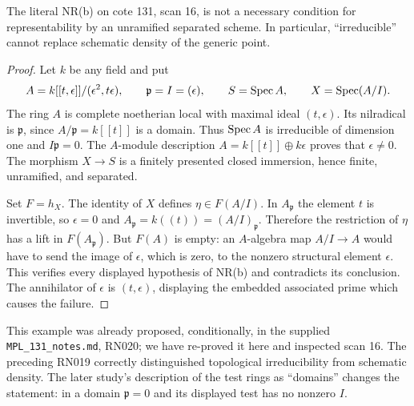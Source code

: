 \begin{proposition}\label{A:NR-counterexample}
The literal NR(b) on cote 131, scan 16, is not a necessary condition for
representability by an unramified separated scheme. In particular,
``irreducible'' cannot replace schematic density of the generic point.
\end{proposition}
\begin{proof}
Let $k$ be any field and put
\[
 A=k[[t,\epsilon]]/(\epsilon^2,t\epsilon),\qquad
 \mathfrak p=I=(\epsilon),\qquad S=\operatorname{Spec} A,\qquad X=\operatorname{Spec}(A/I).
\]
The ring $A$ is complete noetherian local with maximal ideal
$(t,\epsilon)$. Its nilradical is $\mathfrak p$, since $A/\mathfrak p=k[[t]]$
is a domain. Thus $\operatorname{Spec} A$ is irreducible of dimension one and
$I\mathfrak p=0$. The $A$-module description
$A=k[[t]]\oplus k\epsilon$ proves that $\epsilon\ne0$.
The morphism $X\to S$ is a finitely presented closed immersion, hence
finite, unramified, and separated.

Set $F=h_X$. The identity of $X$ defines $\eta\in F(A/I)$.
In $A_{\mathfrak p}$ the element $t$ is invertible, so $\epsilon=0$ and
$A_{\mathfrak p}=k((t))=(A/I)_{\mathfrak p}$. Therefore the restriction
of $\eta$ has a lift in $F(A_{\mathfrak p})$. But $F(A)$ is empty:
an $A$-algebra map $A/I\to A$ would have to send the image of $\epsilon$,
which is zero, to the nonzero structural element $\epsilon$.
This verifies every displayed hypothesis of NR(b) and contradicts its conclusion.
The annihilator of $\epsilon$ is $(t,\epsilon)$, displaying the embedded
associated prime which causes the failure.
\end{proof}

This example was already proposed, conditionally, in the supplied
\texttt{MPL\_131\_notes.md}, RN020; we have re-proved it here and inspected
scan 16. The preceding RN019 correctly distinguished topological
irreducibility from schematic density. The later study's description of the
test rings as ``domains'' changes the statement: in a domain $\mathfrak p=0$
and its displayed test has no nonzero $I$.


